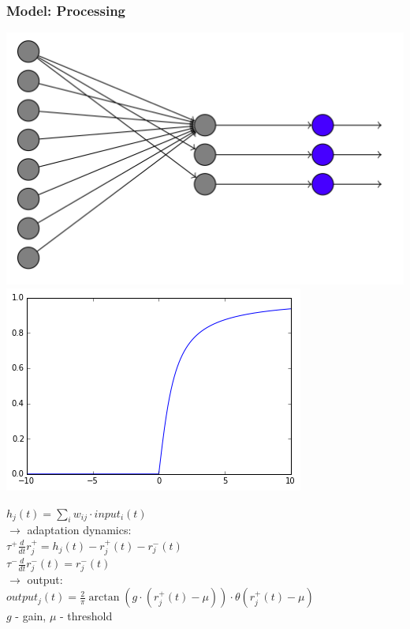 \begin{frame}
\frametitle{Model: Processing}
\begin{multicols}{2}
\begin{center}
\includegraphics[scale=.1]{pics/model_processing}
\vskip 3mm
\includegraphics[scale=.3]{pics/output_function}
\end{center}
\columnbreak
\begin{center}
$h_j(t) = \sum_i w_{ij} \cdot input_i(t)$\\
\vskip 6mm
$\rightarrow$ adaptation dynamics:\\
\vskip 3mm
$\tau^+\frac{d}{dt}r^+_j=h_j(t)-r^+_j(t)-r^-_j(t)$\\
\vskip 3mm
$\tau^-\frac{d}{dt}r^-_j(t)=r^-_j(t)$\\
\vskip 3mm
$\rightarrow$ output:\\
\vskip 3mm
$output_j(t)=\frac{2}{\pi} \arctan (g \cdot (r^+_j(t)-\mu)) \cdot \theta(r_j^+(t)-\mu)$\\
\vskip 3mm
$g$ - gain, $\mu$ - threshold
\end{center}
\end{multicols}
\end{frame}

